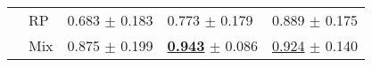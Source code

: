 \begin{tabular}{lllll}
 & RP & \textcolor[rgb]{0.5113947129,0.4886052871,0}{0.683} $\pm$ \textcolor[rgb]{0.6649895152,0.3350104848,0}{0.183} & \textcolor[rgb]{0.6996086106,0.3003913894,0}{0.773} $\pm$ \textcolor[rgb]{0.7894014871,0.2105985129,0}{0.179} & \textcolor[rgb]{0.3720930233,0.5000000000,0}{0.889} $\pm$ \textcolor[rgb]{0.4996792473,0.5000000000,0}{0.175} \\
 & Mix & \textcolor[rgb]{0.0501367366,0.5000000000,0}{0.875} $\pm$ \textcolor[rgb]{0.7263870807,0.2736129193,0}{0.199} & \underline{\textbf{\textcolor[rgb]{0.0000000000,0.5000000000,0}{0.943}}} $\pm$ \textcolor[rgb]{0.1850021874,0.5000000000,0}{0.086} & \underline{\textcolor[rgb]{0.2558139535,0.5000000000,0}{0.924}} $\pm$ \textcolor[rgb]{0.3982647268,0.5000000000,0}{0.140} \\
\bottomrule
\end{tabular}

